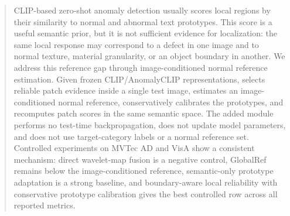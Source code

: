 \begin{abstract}
CLIP-based zero-shot anomaly detection usually scores local regions by their
similarity to normal and abnormal text prototypes. This score is a useful
semantic prior, but it is not sufficient evidence for localization: the same
local response may correspond to a defect in one image and to normal texture,
material granularity, or an object boundary in another. We address this
reference gap through image-conditioned normal reference estimation. Given
frozen CLIP/AnomalyCLIP representations, \method{} selects reliable patch
evidence inside a single test image, estimates an image-conditioned normal
reference, conservatively calibrates the prototypes, and recomputes patch
scores in the same semantic space. The added module performs no test-time
backpropagation, does
not update model parameters, and does not use target-category labels or a
normal reference set. Controlled experiments on MVTec AD and VisA show a
consistent mechanism: direct wavelet-map fusion is a negative control,
GlobalRef remains below the image-conditioned reference, semantic-only
prototype adaptation is a strong baseline, and boundary-aware local reliability
with conservative prototype calibration gives the best controlled row across
all reported metrics.
\end{abstract}
